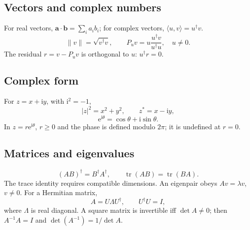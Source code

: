 \makereferencetitle
\begin{referencecolumns}
\begin{referenceentry}
\section{Vectors and complex numbers}
For real vectors, $\mathbf a\cdot\mathbf b=\sum_i a_i b_i$; for complex vectors,
$\langle u,v\rangle=u^\dagger v$.
\[
\|v\|=\sqrt{v^\dagger v},\qquad
P_u v=u\frac{u^\dagger v}{u^\dagger u},\quad u\neq0.
\]
The residual $r=v-P_u v$ is orthogonal to $u$: $u^\dagger r=0$.
\subsection{Complex form}
For $z=x+\mathrm i y$, with $\mathrm i^2=-1$,
\[
|z|^2=x^2+y^2,\qquad z^*=x-\mathrm i y,
\]
\[
\mathrm e^{\mathrm i\theta}=\cos\theta+\mathrm i\sin\theta.
\]
In $z=r\mathrm e^{\mathrm i\theta}$, $r\geq0$ and the phase is defined modulo
$2\pi$; it is undefined at $r=0$.
\end{referenceentry}

\begin{referenceentry}
\section{Matrices and eigenvalues}
\[
(AB)^\dagger=B^\dagger A^\dagger,\qquad
\operatorname{tr}(AB)=\operatorname{tr}(BA).
\]
The trace identity requires compatible dimensions. An eigenpair obeys
$Av=\lambda v$, $v\neq0$. For a Hermitian matrix,
\[
A=U\Lambda U^\dagger,\qquad U^\dagger U=I,
\]
where $\Lambda$ is real diagonal. A square matrix is invertible iff
$\det A\neq0$; then $A^{-1}A=I$ and $\det(A^{-1})=1/\det A$.
\end{referenceentry}

\begin{referenceentry}

\end{referenceentry}
\end{referencecolumns}
